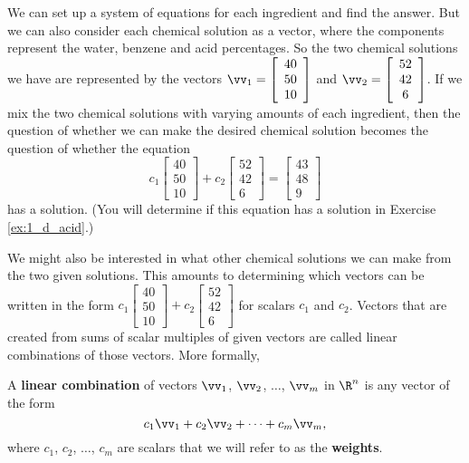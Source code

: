 We can set up a system of equations for each ingredient and find the answer. But we can also consider each chemical solution as a vector, where the components represent the water, benzene and acid percentages. So the two chemical solutions we have are represented by the vectors $\vv_1 = \left[ \begin{array}{c} 40\\50\\10\end{array} \right]$ and $\vv_2 = \left[ \begin{array}{c} 52\\42\\6\end{array} \right]$. If we mix the two chemical solutions with varying amounts of each ingredient, then the question of whether we can make the desired chemical solution becomes the question of whether the equation 
\[ c_1\left[ \begin{array}{c} 40\\50\\10\end{array} \right]+ c_2\left[ \begin{array}{c} 52\\42\\6\end{array} \right] = \left[ \begin{array}{c} 43\\48\\9\end{array} \right]\]
has a solution. (You will determine if this equation has a solution in Exercise \ref{ex:1_d_acid}.) 


We might also be interested in what other chemical solutions we can make from the two given solutions. This amounts to determining which vectors can be written in the form $c_1\left[ \begin{array}{c} 40\\50\\10\end{array} \right]+ c_2\left[ \begin{array}{c} 52\\42\\6\end{array} \right]$ for scalars $c_1$ and $c_2$. Vectors that are created from sums of scalar multiples of given vectors are called linear combinations of those vectors. More formally, 

\begin{definition} \label{1_d_linear_combination} A \textbf{linear combination} of vectors $\vv_1$, $\vv_2$, $\ldots$, $\vv_m$ in $\R^n$ is any vector of the form
\begin{equation}
c_1 \vv_1 + c_2 \vv_2 + \cdots + c_m \vv_m, \label{eq:lin_comb}
\end{equation}
where $c_1$, $c_2$, $\ldots$, $c_m$ are scalars that we will refer to as the \textbf{weights}.
\end{definition}

